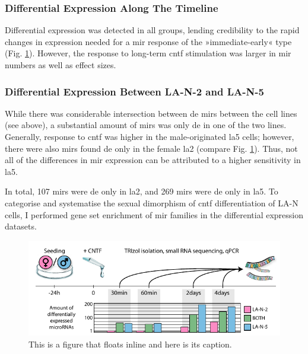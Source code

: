 \subsubsection{Differential Expression Along The Timeline}
Differential expression was detected in all groups, lending credibility to the rapid changes in expression needed for a \ac{mir} response of the »immediate-early« type (Fig. \ref{fig:timepointsexp}). However, the response to long-term \ac{cntf} stimulation was larger in \ac{mir} numbers as well as effect sizes.   

\subsubsection{Differential Expression Between LA-N-2 and LA-N-5}
While there was considerable intersection between \ac{de} \acp{mir} between the cell lines (see above), a substantial amount of \acp{mir} was only \ac{de} in one of the two lines. Generally, response to \ac{cntf} was higher in the male-originated \ac{la5} cells; however, there were also \acp{mir} found \ac{de} only in the female \ac{la2} (compare Fig. \ref{fig:timepointsexp}). Thus, not all of the differences in \ac{mir} expression can be attributed to a higher sensitivity in \ac{la5}.

In total, 107 \acp{mir} were \ac{de} only in \ac{la2}, and 269 \acp{mir} were \ac{de} only in \ac{la5}. To categorise and systematise the sexual dimorphism of \ac{cntf} differentiation of LA-N cells, I performed gene set enrichment of \ac{mir} families in the differential expression datasets.

\begin{figure}
\includegraphics[width=\textwidth]{figures/timepointsexp}
\caption[Short figure name.]{This is a figure that floats inline and here is its caption.
\label{fig:timepointsexp}}
\end{figure}

